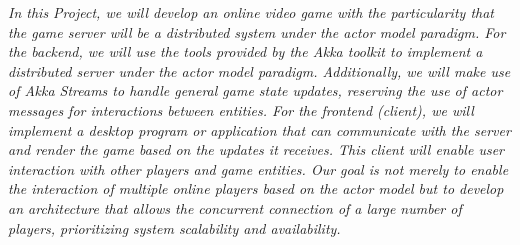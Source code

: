 \textit{
    In this Project, we will develop an online video game with the particularity that the game server will be a distributed system under the actor model paradigm.
    For the backend, we will use the tools provided by the Akka toolkit to implement a distributed server under the actor model paradigm. Additionally, we will make use of Akka Streams to handle general game state updates, reserving the use of actor messages for interactions between entities.
    For the frontend (client), we will implement a desktop program or application that can communicate with the server and render the game based on the updates it receives. This client will enable user interaction with other players and game entities.
    Our goal is not merely to enable the interaction of multiple online players based on the actor model but to develop an architecture that allows the concurrent connection of a large number of players, prioritizing system scalability and availability.
}
